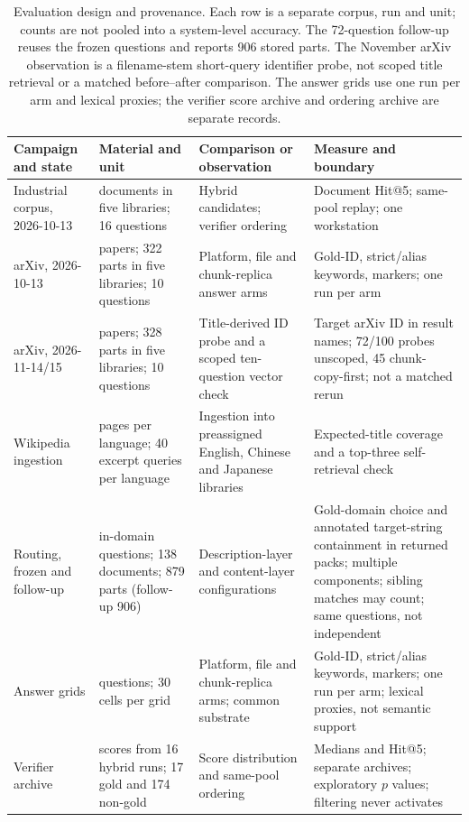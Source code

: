 \documentclass[final,5p,times,twocolumn]{elsarticle}
\begin{document}
\begin{table}[t]
\centering
\footnotesize
\setlength{\tabcolsep}{4pt}
\caption{Evaluation design and provenance. Each row is a separate corpus, run
and unit; counts are not pooled into a system-level accuracy. The 72-question
follow-up reuses the frozen questions and reports 906 stored parts. The
November arXiv observation is a filename-stem short-query identifier probe,
not scoped title retrieval or a matched before--after comparison. The answer
grids use one run per arm and lexical proxies; the verifier score archive and
ordering archive are separate records.}
\label{tab:eval-design}
\begin{tabular}{@{}>{\raggedright\arraybackslash}p{}>{\raggedright\arraybackslash}p{}>{\raggedright\arraybackslash}p{}>{\raggedright\arraybackslash}p{}@{}}
\toprule
Campaign and state & Material and unit & Comparison or observation & Measure and boundary\\
\midrule
Industrial corpus, 2026-10-13 & 42 documents in five libraries; 16 questions & Hybrid candidates; verifier ordering & Document Hit@5; same-pool replay; one workstation\\
arXiv, 2026-10-13 & 100 papers; 322 parts in five libraries; 10 questions & Platform, file and chunk-replica answer arms & Gold-ID, strict/alias keywords, markers; one run per arm\\
arXiv, 2026-11-14/15 & 100 papers; 328 parts in five libraries; 10 questions & Title-derived ID probe and a scoped ten-question vector check & Target arXiv ID in result names; 72/100 probes unscoped, 45 chunk-copy-first; not a matched rerun\\
Wikipedia ingestion & 400 pages per language; 40 excerpt queries per language & Ingestion into preassigned English, Chinese and Japanese libraries & Expected-title coverage and a top-three self-retrieval check\\
Routing, frozen and follow-up & 72 in-domain questions; 138 documents; 879 parts (follow-up 906) & Description-layer and content-layer configurations & Gold-domain choice and annotated target-string containment in returned packs; multiple components; sibling matches may count; same questions, not independent\\
Answer grids & 10 questions; 30 cells per grid & Platform, file and chunk-replica arms; common substrate & Gold-ID, strict/alias keywords, markers; one run per arm; lexical proxies, not semantic support\\
Verifier archive & 191 scores from 16 hybrid runs; 17 gold and 174 non-gold & Score distribution and same-pool ordering & Medians and Hit@5; separate archives; exploratory $p$ values; filtering never activates\\
\bottomrule
\end{tabular}
\end{table}
\end{document}
